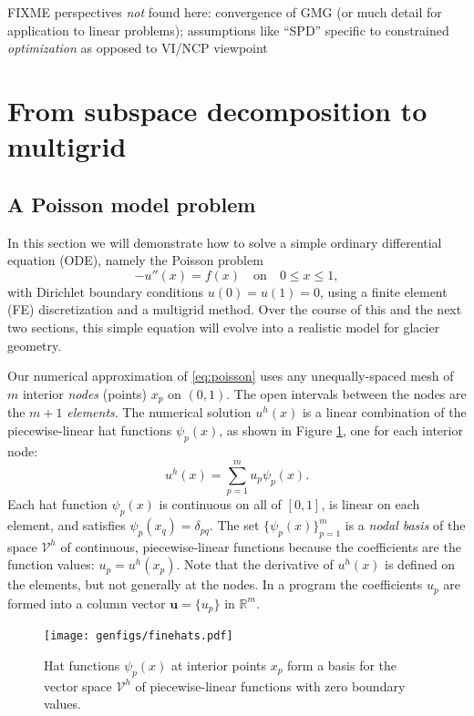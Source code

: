\documentclass[letterpaper,final,12pt,reqno]{amsart}
\newcommand{\RR}{\mathbb{R}}
\newcommand{\bu}{\mathbf{u}}
\numberwithin{equation}{section}
\numberwithin{figure}{section}
\numberwithin{table}{section}
\begin{document}
FIXME perspectives \emph{not} found here: convergence of GMG (or much detail for application to linear problems); assumptions like ``SPD'' specific to constrained \emph{optimization} as opposed to VI/NCP viewpoint


\section{From subspace decomposition to multigrid} \label{sec:subspace}

\subsection*{A Poisson model problem}  In this section we will demonstrate how to solve a simple ordinary differential equation (ODE), namely the Poisson problem
\begin{equation}
- u''(x) = f(x) \quad \text{on} \quad 0 \le x \le 1, \label{eq:poisson}
\end{equation}
with Dirichlet boundary conditions $u(0)=u(1)=0$, using a finite element (FE) discretization and a multigrid method.  Over the course of this and the next two sections, this simple equation will evolve into a realistic model for glacier geometry.

Our numerical approximation of \eqref{eq:poisson} uses any unequally-spaced mesh of $m$ interior \emph{nodes} (points) $x_p$ on $(0,1)$.  The open intervals between the nodes are the $m+1$ \emph{elements}.  The numerical solution $u^h(x)$ is a linear combination of the piecewise-linear hat functions $\psi_p(x)$, as shown in Figure \ref{fig:finehats}, one for each interior node:
\begin{equation}
u^h(x) = \sum_{p=1}^m u_p \psi_p(x). \label{eq:trialsolution}
\end{equation}
Each hat function $\psi_p(x)$ is continuous on all of $[0,1]$, is linear on each element, and satisfies $\psi_p(x_q) = \delta_{pq}$.  The set $\{\psi_p(x)\}_{p=1}^m$ is a \emph{nodal basis} of the space $\mathcal{V}^h$ of continuous, piecewise-linear functions because the coefficients are the function values: $u_p=u^h(x_p)$.  Note that the derivative of $u^h(x)$ is defined on the elements, but not generally at the nodes.  In a program the coefficients $u_p$ are formed into a column vector $\bu=\{u_p\}$ in $\RR^m$.

\begin{figure}
\texttt{[image: genfigs/finehats.pdf]}
\caption{Hat functions $\psi_p(x)$ at interior points $x_p$ form a basis for the vector space $\mathcal{V}^h$ of piecewise-linear functions  with zero boundary values.}
\label{fig:finehats}
\end{figure}
\end{document}
